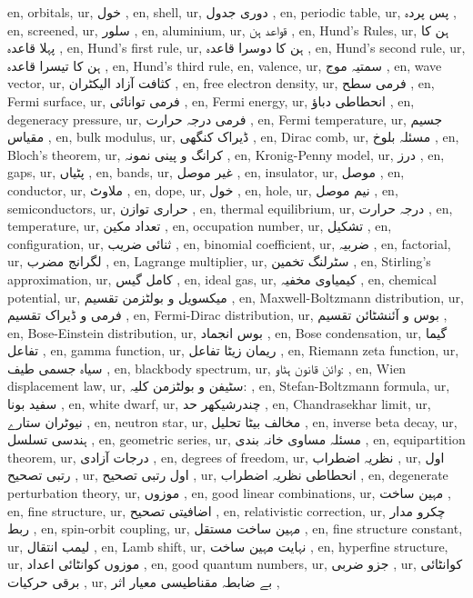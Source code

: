 en, orbitals,
ur, خول ,
en, shell,
ur,  دوری جدول ,
en, periodic table,
ur,  پس پردہ ,
en, screened,
ur, سلور ,
en, aluminium,
ur,  قواعد ہن ,
en, Hund's Rules,
ur,  ہن کا پہلا قاعدہ ,
en, Hund's first rule,
ur,  ہن کا دوسرا قاعدہ ,
en, Hund's second rule,
ur,  ہن کا تیسرا قاعدہ ,
en, Hund's third rule,
en, valence,
ur, سمتیہ موج ,
en, wave vector,
ur, کثافت آزاد الیکٹران ,
en, free electron density,
ur, فرمی سطح ,
en, Fermi surface,
ur, فرمی توانائی ,
en, Fermi energy,
ur, انحطاطی دباؤ ,
en, degeneracy pressure,
ur,  فرمی درجہ حرارت ,
en, Fermi temperature,
ur, جسیم مقیاس ,
en, bulk modulus,
ur,  ڈیراک کنگھی ,
en, Dirac comb,
ur, مسئلہ بلوخ ,
en, Bloch's theorem,
ur,  کرانگ و پینی نمونہ ,
en, Kronig-Penny model,
ur,  درز ,
en, gaps,
ur, پٹیاں ,
en, bands,
ur, غیر موصل ,
en, insulator,
ur, موصل ,
en, conductor,
ur,  ملاوٹ ,
en, dope,
ur,  خول ,
en, hole,
ur, نیم موصل ,
en, semiconductors,
ur, حراری توازن  ,
en, thermal equilibrium,
ur, درجہ حرارت ,
en, temperature,
ur, تعداد مکین ,
en, occupation number,
ur, تشکیل ,
en, configuration,
ur,  ثنائی ضریب  ,
en, binomial coefficient,
ur, ضربیہ ,
en, factorial,
ur, لگرانج مضرب ,
en, Lagrange multiplier,
ur,  سٹرلنگ تخمین ,
en, Stirling's approximation,
ur, کامل گیس ,
en, ideal gas,
ur, کیمیاوی مخفیہ ,
en, chemical potential,
ur,  میکسویل و بولٹزمن تقسیم ,
en, Maxwell-Boltzmann distribution,
ur, فرمی و ڈیراک تقسیم ,
en, Fermi-Dirac distribution,
ur, بوس و آئنشٹائن تقسیم ,
en, Bose-Einstein distribution,
ur,  بوس انجماد ,
en, Bose condensation,
ur,  گیما تفاعل ,
en, gamma function,
ur,  ریمان زیٹا تفاعل ,
en, Riemann zeta function,
ur, سیاہ جسمی طیف ,
en, blackbody spectrum,
ur, وائن قانون ہٹاو: ,
en, Wien displacement law,
ur,  سٹیفن و بولٹزمن کلیہ: ,
en, Stefan-Boltzmann formula,
ur,  سفید بونا ,
en, white dwarf,
ur, چندرشیکھر حد ,
en, Chandrasekhar limit,
ur,  نیوٹران ستارے ,
en, neutron star,
ur, مخالف بیٹا تحلیل ,
en, inverse beta decay,
ur,  ہندسی تسلسل ,
en, geometric series,
ur, مسئلہ مساوی خانہ بندی ,
en, equipartition theorem,
ur,  درجات آزادی ,
en, degrees of freedom,
ur,  نظریہ اضطراب ,
ur, اول رتبی تصحیح ,
ur, اول رتبی تصحیح ,
ur,  انحطاطی نظریہ اضطراب ,
en, degenerate perturbation theory,
ur, موزوں ,
en, good linear combinations,
ur,  مہین ساخت ,
en, fine structure,
ur,  اضافیتی تصحیح ,
en, relativistic correction,
ur,  چکرو مدار ربط ,
en, spin-orbit coupling,
ur, مہین ساخت مستقل ,
en, fine structure constant,
ur,  لیمب انتقال ,
en, Lamb shift,
ur,  نہایت مہین ساخت ,
en, hyperfine structure,
ur, موزوں کوانٹائی اعداد ,
en, good quantum numbers,
ur,  جزو ضربی ,
ur,  کوانٹائی برقی حرکیات  ,
ur, بے ضابطہ مقناطیسی معیار اثر ,
